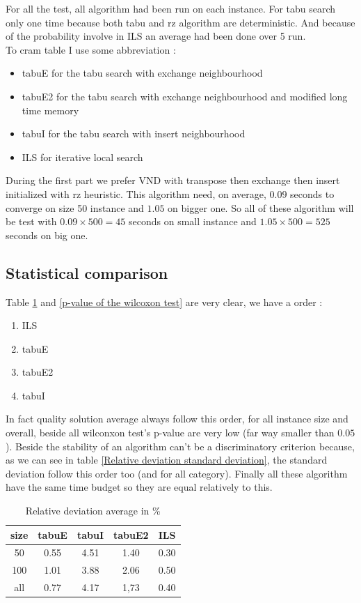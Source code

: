 \documentclass[12pt,a4paper]{article}
\begin{document}
For all the test, all algorithm had been run on each instance. For tabu search only one time because both tabu and rz algorithm are deterministic. And because of the probability involve in ILS an average had been done over 5 run.\\
To cram table I use some abbreviation :
\begin{itemize}
\item
tabuE for the tabu search with exchange neighbourhood
\item
tabuE2 for the tabu search with exchange neighbourhood and modified long time memory
\item
tabuI for the tabu search with insert neighbourhood
\item
ILS for iterative local search
\end{itemize}
During the first part we prefer VND with transpose then exchange then insert initialized with rz heuristic. This algorithm need, on average, $0.09$ seconds to converge on size 50 instance and $1.05$ on bigger one. So all of these algorithm will be test with $0.09 \times 500 = 45$ seconds on small instance and $1.05 \times 500 = 525$ seconds on big one.


\subsection{Statistical comparison}

Table \ref{Relative deviation average} and \ref{p-value of the wilcoxon test} are very clear, we have a order :
\begin{enumerate}[i - ]
\item
ILS
\item
tabuE
\item
tabuE2
\item
tabuI
\end{enumerate}
In fact quality solution average always follow this order, for all instance size and overall, beside all wilconxon test's p-value are very low (far way smaller than $0.05$). Beside the stability of an algorithm can't be a discriminatory criterion because, as we can see in table \ref{Relative deviation standard deviation}, the standard deviation follow this order too (and for all category). Finally all these algorithm have the same time budget so they are equal relatively to this. 

\begin{table}[!h]
\centering
\begin{tabular}{|*{5}{c|}}
  \hline
  size & tabuE & tabuI & tabuE2 & ILS\\
  \hline
  50 & 0.55 & 4.51 & 1.40 & 0.30 \\ 
  100 & 1.01 & 3.88 & 2.06 & 0.50 \\
  all & 0.77 & 4.17 & 1,73 & 0.40 \\
  \hline
\end{tabular}
\caption{Relative deviation average in \%}
\label{Relative deviation average}
\end{table}
\end{document}
